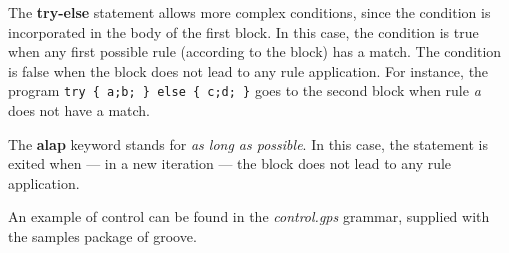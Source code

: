 The \textbf{try-else} statement allows more complex conditions, since the condition is incorporated in the body of the first block. In this case, the condition is true when any first possible rule (according to the block) has a match. The condition is false when the block does not lead to any rule application. 
For instance, the program \texttt{try \{ a;b; \} else \{ c;d; \}} goes to the second block when rule \emph{a} does not have a match. 

The \textbf{alap} keyword stands for \emph{as long as possible}. In this case, the statement is exited when --- in a new iteration --- the block does not lead to any rule application. 

An example of control can be found in the \emph{control.gps} grammar, supplied with the samples package of groove.
